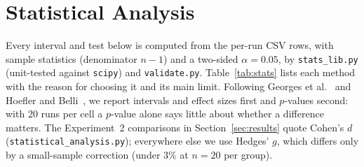 \documentclass[conference]{IEEEtran}
\begin{document}
\section{Statistical Analysis}
\label{sec:stats}
Every interval and test below is computed from the per-run CSV rows, with
sample statistics (denominator $n{-}1$) and a two-sided $\alpha{=}0.05$, by
\texttt{stats\_lib.py} (unit-tested against \texttt{scipy}) and
\texttt{validate.py}. Table~\ref{tab:stats} lists each method with the reason
for choosing it and its main limit. Following Georges et al.~\cite{georges2007} and Hoefler and Belli~\cite{hoefler2015}, we report intervals and effect sizes first
and $p$-values second: with 20 runs per cell a $p$-value alone says little
about whether a difference matters.
The Experiment~2 comparisons in Section~\ref{sec:results} quote Cohen's $d$
(\texttt{statistical\_analysis.py}); everywhere else we use Hedges' $g$, which
differs only by a small-sample correction (under 3\% at $n{=}20$ per group).
\end{document}
